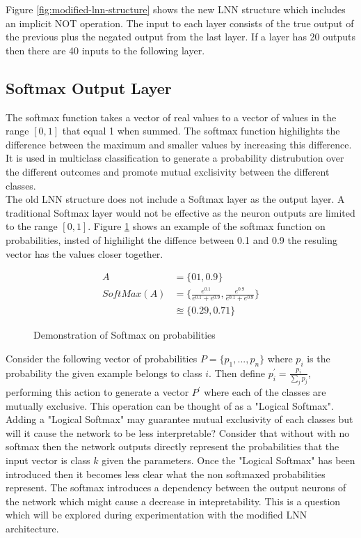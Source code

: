 Figure \ref{fig:modified-lnn-structure} shows the new LNN structure which includes an implicit NOT operation. The input to each layer consists of the true output of the previous plus the negated output from the last layer. If a layer has 20 outputs then there are 40 inputs to the following layer.\\

\subsection{Softmax Output Layer}
The softmax function takes a vector of real values to a vector of values in the range $[0,1]$ that equal 1 when summed. The softmax function highilights the difference between the maximum and smaller values by increasing this difference. It is used in multiclass classification to generate a probability distrubution over the different outcomes and promote mutual exclisivity between the different classes.\\

The old LNN structure does not include a Softmax layer as the output layer. A traditional Softmax layer would not be effective as the neuron outputs are limited to the range $[0,1]$. Figure \ref{fig:softmax-failure} shows an example of the softmax function on probabilities, insted of highilight the diffence between 0.1 and 0.9 the resuling vector has the values closer together.

\begin{figure}[H]
\begin{align*}
A &= \{01, 0.9\}\\
SoftMax(A) &= \{ \frac{e^{0.1}}{e^{0.1} + e^{0.9}}, \frac{e^{0.9}}{e^{0.1} + e^{0.9}} \}\\
&\approxeq \{ 0.29, 0.71 \}
\end{align*}
\caption{Demonstration of Softmax on probabilities}
\label{fig:softmax-failure}
\end{figure}

Consider the following vector of probabilities $P = \{p_1, ..., p_n\}$ where $p_i$ is the probability the given example belongs to class $i$. Then define $p_i^{'} = \frac{p_i}{\sum_j p_j}$, performing this action to generate a vector $P^{'}$ where each of the classes are mutually exclusive. This operation can be thought of as a "Logical Softmax".\\

Adding a "Logical Softmax" may guarantee mutual exclusivity of each classes but will it cause the network to be less interpretable? Consider that without with no softmax then the network outputs directly represent the probabilities that the input vector is class $k$ given the parameters. Once the "Logical Softmax" has been introduced then it becomes less clear what the non softmaxed probabilities represent. The softmax introduces a dependency between the output neurons of the network which might cause a decrease in intepretability. This is a question which will be explored during experimentation with the modified LNN architecture.

